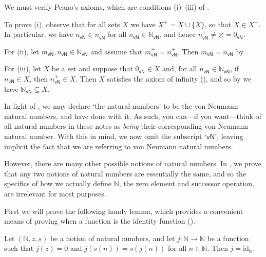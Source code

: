 \begin{cproof}
We must verify Peano's axioms, which are conditions (i)--(iii) of .

To prove (i), observe that for all sets $X$ we have $X^+ = X \cup \{ X \}$, so that $X \in X^+$. In particular, we have $n_{\mathsf{vN}} \in n_{\mathsf{vN}}^+$ for all $n_{\mathsf{vN}} \in \mathbb{N}_{\mathsf{vN}}$, and hence $n_{\mathsf{vN}}^+ \ne \varnothing = 0_{\mathsf{vN}}$.

For (ii), let $m_{\mathsf{vN}}, n_{\mathsf{vN}} \in \mathbb{N}_{\mathsf{vN}}$ and assume that $m_{\mathsf{vN}}^+ = n_{\mathsf{vN}}^+$. Then $m_{\mathsf{vN}} = n_{\mathsf{vN}}$ by .

For (iii), let $X$ be a set and suppose that $0_{\mathsf{vN}} \in X$ and, for all $n_{\mathsf{vN}} \in \mathbb{N}_{\mathsf{vN}}$, if $n_{\mathsf{vN}} \in X$, then $n_{\mathsf{vN}}^+ \in X$. Then $X$ satisfies the axiom of infinity (), and so by  we have $\mathbb{N}_{\mathsf{vN}} \subseteq X$.
\end{cproof}

In light of , we may declare `the natural numbers' to be the von Neumann natural numbers, and have done with it. As such, you can---if you want---think of all natural numbers in these notes as \textit{being} their corresponding von Neumann natural number. With this in mind, we now omit the subscript `$\mathsf{vN}$', leaving implicit the fact that we are referring to von Neumann natural numbers.

However, there are many other possible notions of natural numbers. In , we prove that any two notions of natural numbers are essentially the same, and so the specifics of how we actually define $\mathbb{N}$, the zero element and successor operation, are irrelevant for most purposes.

First we will prove the following handy lemma, which provides a convenient means of proving when a function is the identity function ().

\begin{lemma}
\label{lemIdentityFromNNN}
Let $(\mathbb{\mathbb{N}}, z, s)$ be a notion of natural numbers, and let $j : \mathbb{N} \to \mathbb{N}$ be a function such that $j(z) = 0$ and $j(s(n)) = s(j(n))$ for all $n \in \mathbb{N}$. Then $j = \mathrm{id}_{\mathbb{N}}$.
\end{lemma}

